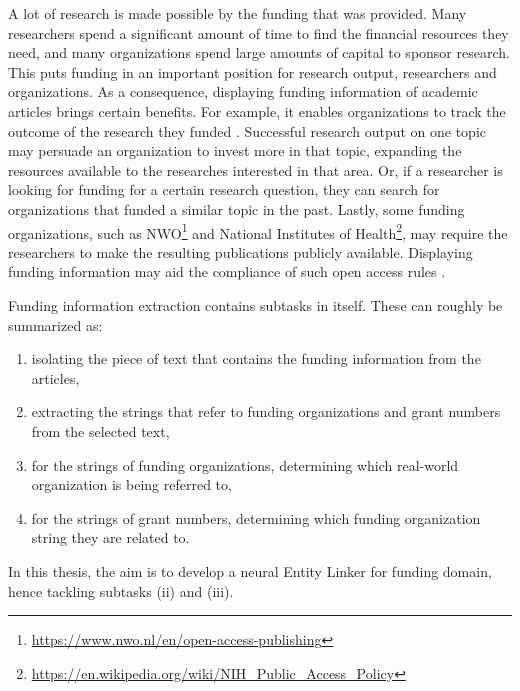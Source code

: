 \documentclass{report}
\theoremstyle{definition}
\theoremstyle{remark}
\begin{document}
A lot of research is made possible by the funding that was provided. Many researchers spend a significant amount of time to find the financial resources they need, and many organizations spend large amounts of capital to sponsor research. This puts funding in an important position for research output, researchers and organizations. As a consequence, displaying funding information of academic articles brings certain benefits. For example, it enables organizations to track the outcome of the research they funded \cite{ElsPaper}. Successful research output on one topic may persuade an organization to invest more in that topic, expanding the resources available to the researches interested in that area. Or, if a researcher is looking for funding for a certain research question, they can search for organizations that funded a similar topic in the past. Lastly, some funding organizations, such as NWO\footnote{\url{https://www.nwo.nl/en/open-access-publishing}} and National Institutes of Health\footnote{\url{https://en.wikipedia.org/wiki/NIH_Public_Access_Policy}},  may require the researchers to make the resulting publications publicly available. Displaying funding information may aid the compliance of such open access rules \cite{GrantExtractor}. 

Funding information extraction contains subtasks in itself. These can roughly be summarized as:\vspace{0.2cm}
\renewcommand{\labelenumi}{(\roman{enumi})}
\begin{enumerate}
     \vspace{-0.3cm}\item isolating the piece of text that contains the funding information from the articles,
     \vspace{-0.6cm}\item extracting the strings that refer to funding organizations and grant numbers from the selected text,
     \vspace{-0.3cm}\item for the strings of funding organizations, determining which real-world organization is being referred to,
     \vspace{-0.3cm}\item for the strings of grant numbers, determining which funding organization string they are related to.
\end{enumerate}

\vspace{-0.3cm}\noindent In this thesis, the aim is to develop a neural Entity Linker for funding domain, hence tackling subtasks (ii) and (iii). 
\end{document}
